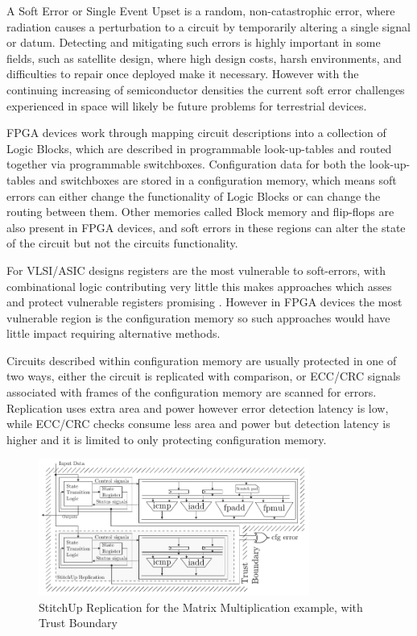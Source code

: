A Soft Error or Single Event Upset is a random, non-catastrophic error, where radiation causes
a perturbation to a circuit by temporarily altering a single signal or datum.
Detecting and mitigating such errors is highly important in some fields, such as satellite design, 
where high design costs, harsh environments, and difficulties to repair once deployed make it necessary. 
However with the continuing increasing of semiconductor densities the current soft error
challenges experienced in space will likely be future problems for terrestrial devices\cite{normand1996single}\cite{henkel2013reliable}.

FPGA devices work through mapping circuit descriptions into a collection of Logic Blocks,
which are described in programmable look-up-tables and routed together via
programmable switchboxes.
Configuration data for both the look-up-tables and switchboxes are stored in a
configuration memory, which means soft errors can either change the functionality
of Logic Blocks or can change the routing between them.
Other memories called Block memory and flip-flops are also present in FPGA devices,
and soft errors in these regions can alter the state of the circuit but not the
circuits functionality.

For VLSI/ASIC designs registers are the most vulnerable to soft-errors, with
combinational logic contributing very little \cite{baumann2005soft} this makes
approaches which asses and protect vulnerable registers promising \cite{chen2014reliability}.
However in FPGA devices the most vulnerable region is the configuration memory
so such approaches would have little impact requiring alternative methods.

Circuits described within configuration memory are usually protected in one of two ways,
either the circuit is replicated with comparison, or ECC/CRC signals associated with
frames of the configuration memory are scanned for errors.
Replication uses extra area and power however error detection latency is low,
while ECC/CRC checks consume less area and power but detection latency is higher and
it is limited to only protecting configuration memory.

\begin{figure}[h]
\centering
\includegraphics[width=3.5in]{./imgs/StitchUpReplication.pdf}
\caption{StitchUp Replication for the Matrix Multiplication example, with Trust Boundary}
\label{fig:HLSArch}
\end{figure}

